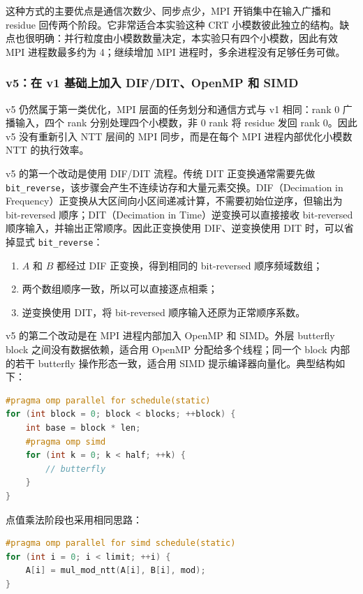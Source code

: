 \documentclass[a4paper]{article}
\begin{document}
这种方式的主要优点是通信次数少、同步点少，MPI 开销集中在输入广播和 residue 回传两个阶段。它非常适合本实验这种 CRT 小模数彼此独立的结构。缺点也很明确：并行粒度由小模数数量决定，本实验只有四个小模数，因此有效 MPI 进程数最多约为 4；继续增加 MPI 进程时，多余进程没有足够任务可做。

\subsubsection{v5：在 v1 基础上加入 DIF/DIT、OpenMP 和 SIMD}

v5 仍然属于第一类优化，MPI 层面的任务划分和通信方式与 v1 相同：rank 0 广播输入，四个 rank 分别处理四个小模数，非 0 rank 将 residue 发回 rank 0。因此 v5 没有重新引入 NTT 层间的 MPI 同步，而是在每个 MPI 进程内部优化小模数 NTT 的执行效率。

v5 的第一个改动是使用 DIF/DIT 流程。传统 DIT 正变换通常需要先做 \texttt{bit\_reverse}，该步骤会产生不连续访存和大量元素交换。DIF（Decimation in Frequency）正变换从大区间向小区间递减计算，不需要初始位逆序，但输出为 bit-reversed 顺序；DIT（Decimation in Time）逆变换可以直接接收 bit-reversed 顺序输入，并输出正常顺序。因此正变换使用 DIF、逆变换使用 DIT 时，可以省掉显式 \texttt{bit\_reverse}：
\begin{enumerate}
    \item $A$ 和 $B$ 都经过 DIF 正变换，得到相同的 bit-reversed 顺序频域数组；
    \item 两个数组顺序一致，所以可以直接逐点相乘；
    \item 逆变换使用 DIT，将 bit-reversed 顺序输入还原为正常顺序系数。
\end{enumerate}

v5 的第二个改动是在 MPI 进程内部加入 OpenMP 和 SIMD。外层 butterfly block 之间没有数据依赖，适合用 OpenMP 分配给多个线程；同一个 block 内部的若干 butterfly 操作形态一致，适合用 SIMD 提示编译器向量化。典型结构如下：
\begin{lstlisting}[language=C++,title=v5 的进程内 OpenMP/SIMD 结构]
#pragma omp parallel for schedule(static)
for (int block = 0; block < blocks; ++block) {
    int base = block * len;
    #pragma omp simd
    for (int k = 0; k < half; ++k) {
        // butterfly
    }
}
\end{lstlisting}

点值乘法阶段也采用相同思路：
\begin{lstlisting}[language=C++]
#pragma omp parallel for simd schedule(static)
for (int i = 0; i < limit; ++i) {
    A[i] = mul_mod_ntt(A[i], B[i], mod);
}
\end{lstlisting}
\end{document}
